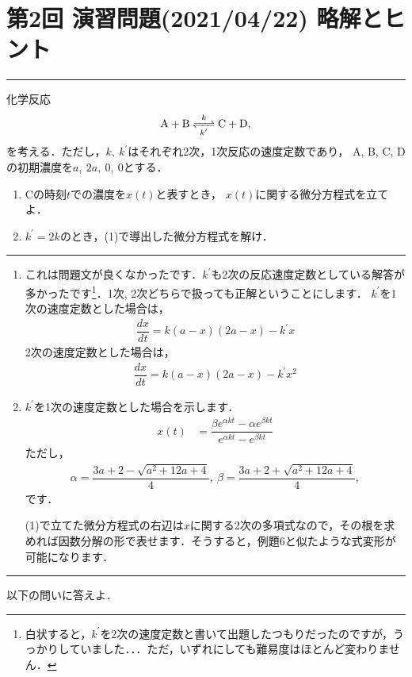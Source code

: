 \documentclass[11pt,a4]{jsarticle}
\numberwithin{equation}{section}
\begin{document}
\section*{第2回 演習問題(2021/04/22) 略解とヒント}
%
\hrule
%
\vspace*{.2cm}
\enshu
化学反応
\begin{align*}
  \ce{A + B <=>[k][k^{\prime}] C + D}, 
\end{align*}
を考える．ただし，$k,~k^{\prime}$はそれぞれ2次，1次反応の速度定数であり，
A, B, C, Dの初期濃度を$a,~2a,~0,~0$とする．
\begin{enumerate}[(1)]
  \item Cの時刻$t$での濃度を$x(t)$と表すとき，
	$x(t)$に関する微分方程式を立てよ．
  \item $k^\prime = 2k$のとき，(1)で導出した微分方程式を解け． 
\end{enumerate}
%
\hrule
\vspace*{.2cm}
%
\begin{enumerate}[(1)]
\item これは問題文が良くなかったです．$k^{\prime}$も2次の反応速度定数としている解答が多かったです\footnote{白状すると，$k^{\prime}$を2次の速度定数と書いて出題したつもりだったのですが，うっかりしていました．．．ただ，いずれにしても難易度はほとんど変わりません．}．1次, 2次どちらで扱っても正解ということにします．
$k^{\prime}$を1次の速度定数とした場合は，
\begin{align*}
 \dfrac{dx}{dt} = k(a-x)(2a-x) - k^{\prime}x 
\end{align*}
2次の速度定数とした場合は，
\begin{align*}
 \dfrac{dx}{dt} = k(a-x)(2a-x) - k^{\prime}x^2
\end{align*}
%
\item $k^{\prime}$を1次の速度定数とした場合を示します．
\begin{align*}
x\left(t\right) & =\dfrac{\beta e^{\alpha kt}-\alpha e^{\beta kt}}{e^{\alpha kt}-e^{\beta kt}}
\end{align*}
ただし，
\begin{align}
 \alpha = \dfrac{3a+2-\sqrt{a^2+12a+4}}{4},~\beta = \dfrac{3a+2+\sqrt{a^2+12a+4}}{4}, 
\end{align}
です．

(1)で立てた微分方程式の右辺は$x$に関する2次の多項式なので，その根を求めれば因数分解の形で表せます．そうすると，例題6と似たような式変形が可能になります．

%
\end{enumerate}
%
\newpage
%
\hrule
\enshu
以下の問いに答えよ．
\end{document}
